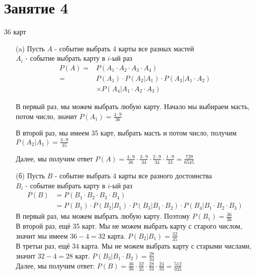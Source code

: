 \section*{Занятие 4}
\begin{exercise}[1] 36 карт
	\begin{enumerate}
		\item [(a)] Пусть $A$ - событие выбрать 4 карты все разных мастей \\ $A_i$ - событие выбрать карту в $i$-ый раз	
		\begin{align*}
		P(A) = & P(A_1 \cdot A_2 \cdot A_3 \cdot A_4) \\ = & P(A_1) \cdot P(A_2|A_1) \cdot P(A_3|A_1 \cdot A_2) \\ & \times P(A_4 | A_1 \cdot A_2 \cdot A_3)
		\end{align*} 
	
		В первый раз, мы можем выбрать любую карту. Начало мы выбираем масть, потом число, значит $P(A_1) = \frac{4 \cdot 9}{36}$
		
		В второй раз, мы имеем 35 карт, выбрать масть и потом число, получим $P(A_2 | A_1) = \frac{3 \cdot 9}{35}$
		
		Далее, мы получим ответ $P(A) = \frac{4 \cdot 9}{36} \cdot \frac{3 \cdot 9}{34} \cdot \frac{2 \cdot 9}{34} \cdot \frac{1 \cdot 9}{33} = \frac{729}{6545}$
		\item [(б)] Пусть $B$ - событие выбрать 4 карты все разного достоинства \\ $B_i$ - событие выбрать карту в $i$-ый раз \begin{align*}
			P(B) &= P(B_1 \cdot B_2 \cdot B_3 \cdot B_4) \\ &= P(B_1) \cdot P(B_2|B_1) \cdot P(B_3|B_1 \cdot B_2) \cdot P(B_4 | B_1 \cdot B_2 \cdot B_3)
		\end{align*} 
	В первый раз, мы можем выбрать любую карту. Поэтому $P(B_1) = \frac{36}{36}$ \\ В второй раз, ещё 35 карт. Мы не можем выбрать карту с старого числом, значит мы имеем $36-4=32$ карта. $P(B_2 | B_1) = \frac{32}{35}$ \\ В третьи раз, ещё 34 карта. Мы не можем выбрать карту с старыми числами, значит $32-4=28$ карт. $P(B_3 | B_1 \cdot B_2) = \frac{28}{34}$ \\ Далее, мы получим ответ: $P(B) = \frac{36}{36} \cdot \frac{32}{35} \cdot \frac{28}{34} \cdot \frac{24}{33} = \frac{512}{935}$
	\end{enumerate}
\end{exercise}

